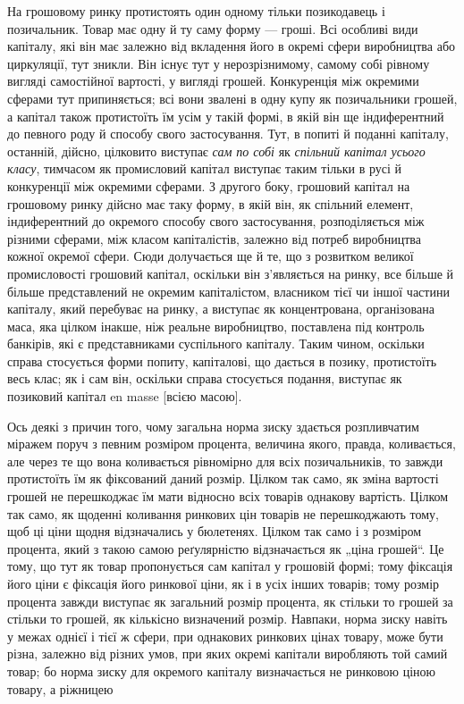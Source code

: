 
На грошовому ринку протистоять один одному тільки позикодавець
і позичальник. Товар має одну й ту саму форму —
гроші. Всі особливі види капіталу, які він має залежно від
вкладення його в окремі сфери виробництва або циркуляції,
тут зникли. Він існує тут у нерозрізнимому, самому собі рівному
вигляді самостійної вартості, у вигляді грошей. Конкуренція між
окремими сферами тут припиняється; всі вони звалені в одну купу
як позичальники грошей, а капітал також протистоїть їм усім
у такій формі, в якій він ще індиферентний до певного роду й способу
свого застосування. Тут, в попиті й поданні капіталу, останній,
дійсно, цілковито виступає \emph{сам по собі} як \emph{спільний капітал
усього класу}, тимчасом як промисловий капітал виступає
таким тільки в русі й конкуренції між окремими сферами.
З другого боку, грошовий капітал на грошовому ринку дійсно
має таку форму, в якій він, як спільний елемент, індиферентний до
окремого способу свого застосування, розподіляється між різними
сферами, між класом капіталістів, залежно від потреб
виробництва кожної окремої сфери. Сюди долучається ще й те,
що з розвитком великої промисловості грошовий капітал, оскільки
він з’являється на ринку, все більше й більше представлений не
окремим капіталістом, власником тієї чи іншої частини капіталу,
який перебуває на ринку, а виступає як концентрована,
організована маса, яка цілком інакше, ніж реальне виробництво,
поставлена під контроль банкірів, які є представниками суспільного
капіталу. Таким чином, оскільки справа стосується форми попиту,
капіталові, що дається в позику, протистоїть весь клас;
як і сам він, оскільки справа стосується подання, виступає як
позиковий капітал en masse [всією масою].

Ось деякі з причин того, чому загальна норма зиску здається
розпливчатим міражем поруч з певним розміром процента, величина
якого, правда, коливається, але через те що вона коливається
рівномірно для всіх позичальників, то завжди протистоїть
їм як фіксований даний розмір. Цілком так само, як
зміна вартості грошей не перешкоджає їм мати відносно всіх
товарів однакову вартість. Цілком так само, як щоденні коливання
ринкових цін товарів не перешкоджають тому, щоб ці ціни
щодня відзначались у бюлетенях. Цілком так само і з розміром
процента, який з такою самою реґулярністю відзначається як
„ціна грошей“. Це тому, що тут як товар пропонується сам
капітал у грошовій формі; тому фіксація його ціни є фіксація
його ринкової ціни, як і в усіх інших товарів; тому розмір процента
завжди виступає як загальний розмір процента, як
стільки то грошей за стільки то грошей, як кількісно визначений
розмір. Навпаки, норма зиску навіть у межах однієї
і тієї ж сфери, при однакових ринкових цінах товару, може
бути різна, залежно від різних умов, при яких окремі капітали
виробляють той самий товар; бо норма зиску для окремого
капіталу визначається не ринковою ціною товару, а ріжницею
\parbreak{}  %
